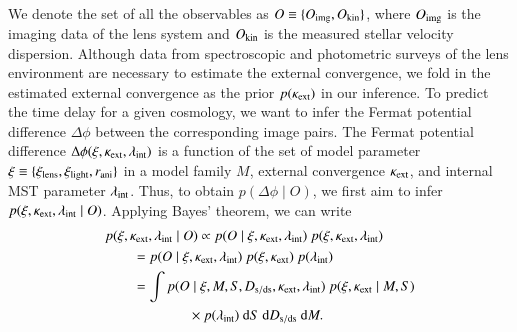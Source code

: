 \documentclass[longauth]{aa}
\newcommand{\rmd}{{\rm d}}
\newcommand{\ajs}[1]{{{#1}}}
\begin{document}
We denote the set of all the observables as ${O} \equiv \{{O}_{\rm img}, {O}_{\rm kin} \}$, where ${O}_{\rm img}$ is the imaging data of the lens system and ${O}_{\rm kin}$ is the measured stellar velocity dispersion. Although data from spectroscopic and photometric \ajs{surveys} of the lens environment are necessary to estimate the external convergence, we fold in the estimated external convergence as the prior $p(\kappa_{\rm ext})$ in our inference. To predict the time delay for a given cosmology, we want to infer the Fermat potential difference $\Delta \phi$ between the corresponding image pairs. The Fermat potential difference $\Delta \phi(\xi, \kappa_{\rm ext}, \lambda_{\rm int})$ is a function of the set of model parameter $\xi \equiv \{\xi_{\rm lens}, \xi_{\rm light}, r_{\rm ani} \}$ in a model family $M$, external convergence $\kappa_{\rm ext}$, and internal MST parameter $\lambda_{\rm int}$. Thus, to obtain $p(\Delta \phi \mid O)$, we first aim to infer $p(\xi, \kappa_{\rm ext}, \lambda_{\rm int} \mid O)$. Applying Bayes' theorem, we can write
%
\begin{equation} \label{eq:master_bayes}
\begin{split}
        &p(\xi, \kappa_{\rm ext}, \lambda_{\rm int} \mid O) \propto p (O \mid \xi, \kappa_{\rm ext}, \lambda_{\rm int}) \ p(\xi, \kappa_{\rm ext}, \lambda_{\rm int}) \\
    & \qquad = p(O \mid \xi, \kappa_{\rm ext}, \lambda_{\rm int})\ p(\xi, \kappa_{\rm ext}) \ p(\lambda_{\rm int}) \\
    & \qquad = \int p(O \mid \xi, M, S, D_{\rm s/ds}, \kappa_{\rm ext}, \lambda_{\rm int})\ p(\xi, \kappa_{\rm ext} \mid M, S) \\
    & \qquad \qquad \qquad \times p(\lambda_{\rm int}) \ \rmd S \ \rmd D_{\rm s/ds} \ \rmd M.
\end{split}
\end{equation}
%
\end{document}
